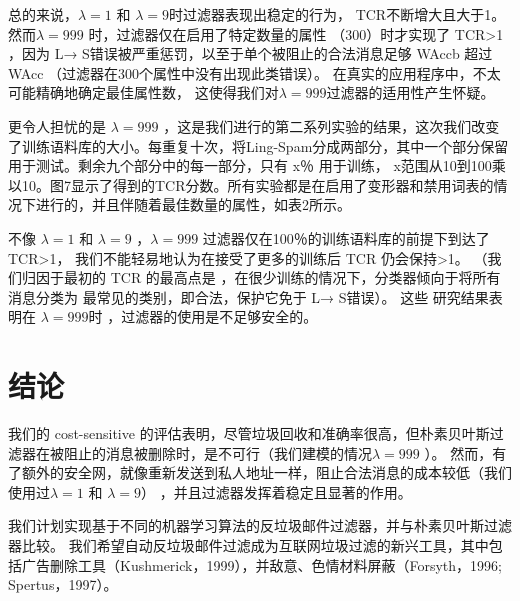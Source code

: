 \documentclass[UTF8]{ctexart}
\begin{document}
总的来说，$\lambda=1$ 和 $\lambda=9$时过滤器表现出稳定的行为， TCR不断增大且大于1。然而$ \lambda=999$ 时，过滤器仅在启用了特定数量的属性 （300）时才实现了 TCR>1 ，因为 L→ S错误被严重惩罚，以至于单个被阻止的合法消息足够  WAccb 超过 WAcc （过滤器在300个属性中没有出现此类错误）。 在真实的应用程序中，不太可能精确地确定最佳属性数， 这使得我们对$\lambda=999$过滤器的适用性产生怀疑。

更令人担忧的是 $\lambda=999$ ，这是我们进行的第二系列实验的结果，这次我们改变了训练语料库的大小。每重复十次，将Ling-Spam分成两部分，其中一个部分保留用于测试。剩余九个部分中的每一部分，只有 x％ 用于训练， x范围从10到100乘以10。图7显示了得到的TCR分数。所有实验都是在启用了变形器和禁用词表的情况下进行的，并且伴随着最佳数量的属性，如表2所示。

不像 $\lambda=1$ 和 $\lambda=9$ ，$\lambda=999$ 过滤器仅在100％的训练语料库的前提下到达了 TCR>1， 我们不能轻易地认为在接受了更多的训练后 TCR 仍会保持>1。 （我们归因于最初的 TCR 的最高点是 ，在很少训练的情况下，分类器倾向于将所有消息分类为 最常见的类别，即合法，保护它免于 L→ S错误）。 这些 研究结果表明在 $\lambda=999$时 ，过滤器的使用是不足够安全的。

\section{结论}
我们的 cost-sensitive 的评估表明，尽管垃圾回收和准确率很高，但朴素贝叶斯过滤器在被阻止的消息被删除时，是不可行（我们建模的情况$ \lambda=999$ ）。 然而，有了额外的安全网，就像重新发送到私人地址一样，阻止合法消息的成本较低（我们使用过$ \lambda=1$ 和 $\lambda=9$） ，并且过滤器发挥着稳定且显著的作用。

我们计划实现基于不同的机器学习算法的反垃圾邮件过滤器，并与朴素贝叶斯过滤器比较。 我们希望自动反垃圾邮件过滤成为互联网垃圾过滤的新兴工具，其中包括广告删除工具（Kushmerick，1999），并敌意、色情材料屏蔽（Forsyth，1996; Spertus，1997）。
\end{document}
